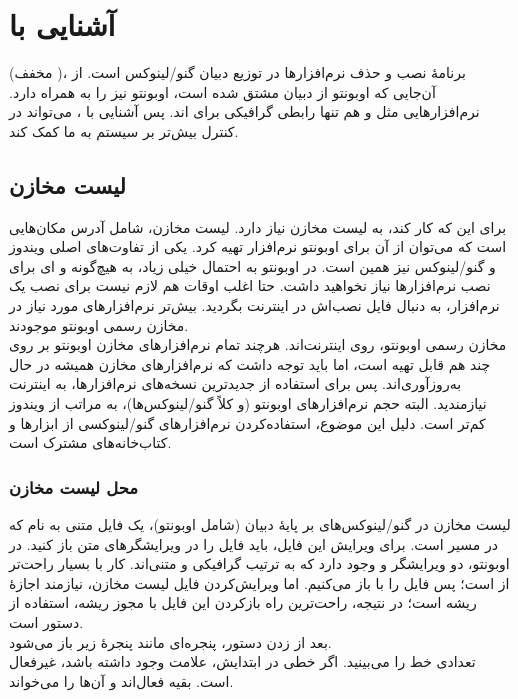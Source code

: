 \section[آشنایی با Apt]{آشنایی با }
 (مخفف )، برنامهٔ نصب و حذف نرم‌افزارها در توزیع دبیان گنو/لینوکس است. از آن‌جایی که اوبونتو از دبیان مشتق شده است، اوبونتو نیز  را به همراه دارد. نرم‌افزارهایی مثل  و  هم تنها رابطی گرافیکی برای  اند. پس آشنایی با ، می‌تواند در کنترل بیش‌تر بر سیستم به ما کمک کند.

\subsection{لیست مخازن}
برای این که  کار کند، به لیست مخازن نیاز دارد. لیست مخازن، شامل آدرس مکان‌هایی است که می‌توان از آن برای اوبونتو نرم‌افزار تهیه کرد. یکی از تفاوت‌های اصلی ویندوز و گنو/لینوکس نیز همین است. در اوبونتو به احتمال خیلی زیاد، به هیچ‌گونه  و ای برای نصب نرم‌افزارها نیاز نخواهید داشت. حتا اغلب اوقات هم لازم نیست برای نصب یک نرم‌افزار، به دنبال فایل نصب‌اش در اینترنت بگردید. بیش‌تر نرم‌افزارهای مورد نیاز در مخازن رسمی اوبونتو موجودند.\\
مخازن رسمی اوبونتو، روی اینترنت‌اند. هرچند تمام نرم‌افزارهای مخازن اوبونتو بر روی چند  هم قابل تهیه است، اما باید توجه داشت که نرم‌افزارهای مخازن همیشه در حال به‌روزآوری‌اند. پس برای استفاده از جدیدترین نسخه‌های نرم‌افزارها، به اینترنت نیازمندید. البته حجم نرم‌افزارهای اوبونتو (و کلاً گنو/لینوکس‌ها)، به مراتب از ویندوز کم‌تر است. دلیل این موضوع، استفاده‌کردن نرم‌افزارهای گنو/لینوکسی از ابزارها و کتاب‌خانه‌های مشترک است.\\
\subsubsection{محل لیست مخازن}
لیست مخازن در گنو/لینوکس‌های بر پایهٔ دبیان (شامل اوبونتو)، یک فایل متنی به نام  که در مسیر  است. برای ویرایش این فایل، باید فایل را در ویرایشگرهای متن باز کنید. در اوبونتو، دو ویرایشگر  و  وجود دارد که به ترتیب گرافیکی و متنی‌اند. کار با  بسیار راحت‌تر از  است؛ پس فایل را با  باز می‌کنیم. اما ویرایش‌کردن فایل لیست مخازن، نیازمند اجازهٔ ریشه است؛ در نتیجه، راحت‌ترین راه بازکردن این فایل با مجوز ریشه، استفاده از دستور  است.\\
بعد از زدن دستور، پنجره‌ای مانند پنجرهٔ زیر باز می‌شود.\\
تعدادی خط را می‌بینید. اگر خطی در ابتدایش، علامت \lr{\texttt{\#}} وجود داشته باشد، غیرفعال است. بقیه فعال‌اند و  آن‌ها را می‌خواند.

